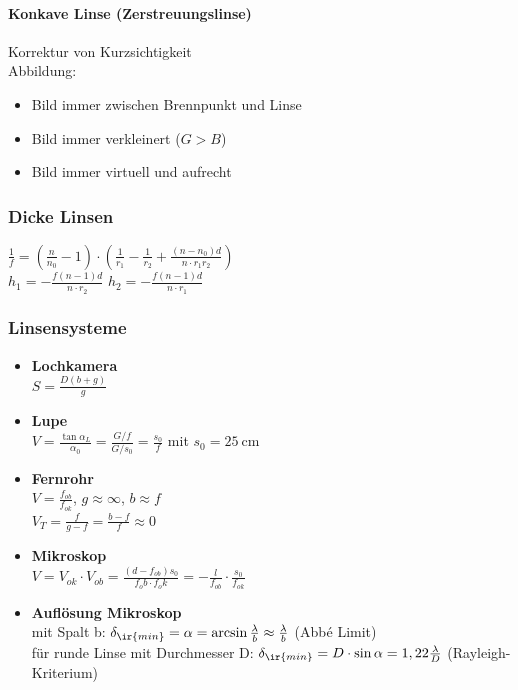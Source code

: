 \begin{sectionbox}
    \paragraph{Konkave Linse (Zerstreuungslinse)}
    Korrektur von Kurzsichtigkeit\\
    Abbildung:
    \begin{itemize}
        \item[$\rightarrow$] Bild immer zwischen Brennpunkt und Linse
        \item[$\rightarrow$] Bild immer verkleinert ($G>B$)
        \item[$\rightarrow$] Bild immer virtuell und aufrecht
    \end{itemize}

    \subsubsection{Dicke Linsen}
    $\frac{1}{f}=(\frac{n}{n_0}-1)\cdot(\frac{1}{r_1}-\frac{1}{r_2}+\frac{(n-n_0)d}{n \cdot r_1 r_2})$\\
    $h_1=-\frac{f(n-1)d}{n \cdot r_2}$ \qquad $h_2=-\frac{f(n-1)d}{n \cdot r_1}$

    \subsubsection{Linsensysteme}
    \begin{itemize}
        \item \textbf{Lochkamera} \\
              $S=\frac{D(b+g)}{g}$
        \item \textbf{Lupe} \\
              $V=\frac{\tan \alpha_L}{\alpha_0}=\frac{G/f}{G/s_0}=\frac{s_0}{f}$ mit $s_0=\SI{25}{\centi \meter}$
        \item \textbf{Fernrohr} \\
              $V=\frac{f_{ob}}{f_{ok}}$, $g\approx \infty$, $b\approx f$ \\
              $V_T=\frac{f}{g-f}=\frac{b-f}{f}\approx 0$
        \item \textbf{Mikroskop} \\
              $V=V_{ok}\cdot V_{ob}=\frac{(d-f_{ob})s_0}{f_ob \cdot f_ok}=-\frac{l}{f_{ob}}\cdot \frac{s_0}{f_{ok}}$
        \item \textbf{Auflösung Mikroskop} \\
              mit Spalt b: $\delta_{\ir{min}} = \alpha = \arcsin\frac{\lambda}{b} \approx \frac{\lambda}{b}$ (Abbé Limit)\\
              für runde Linse mit Durchmesser D: $\delta_{\ir{min}} = D\cdot\sin\alpha = 1,22\frac{\lambda}{D}$ (Rayleigh-Kriterium)\\
    \end{itemize}
\end{sectionbox}

